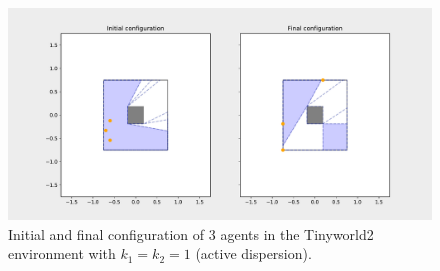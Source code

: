 \begin{figure}[H]
  \centering
  \includegraphics[width=\textwidth]{figs/tinyworld2_3_agnt_k_1_1_k_2_1_distr.pdf}
  \caption{Initial and final configuration of 3 agents in the Tinyworld2 environment with $k_{1} = k_{2} = 1$ (active dispersion).}
  \label{fig:3_agnt_tw2_k_1_1_k_2_1_distr}
\end{figure}
